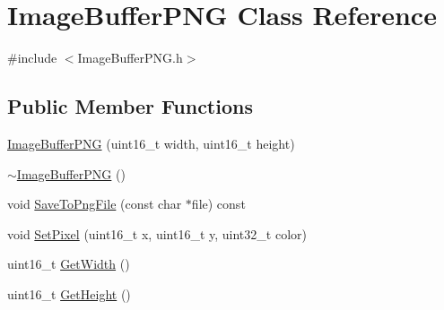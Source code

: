 \hypertarget{class_image_buffer_p_n_g}{\section{Image\-Buffer\-P\-N\-G Class Reference}
\label{class_image_buffer_p_n_g}
}


{\ttfamily \#include $<$Image\-Buffer\-P\-N\-G.\-h$>$}

\subsection*{Public Member Functions}
\begin{DoxyCompactItemize}
\item 
\hyperlink{class_image_buffer_p_n_g_a983171facccfa80ff2878648ce5014e6}{Image\-Buffer\-P\-N\-G} (uint16\-\_\-t width, uint16\-\_\-t height)
\item 
\hyperlink{class_image_buffer_p_n_g_adebf4533c8b386777325192611538a40}{$\sim$\-Image\-Buffer\-P\-N\-G} ()
\item 
void \hyperlink{class_image_buffer_p_n_g_a3476773334d84326b7d797bfe111f8ec}{Save\-To\-Png\-File} (const char $\ast$file) const 
\item 
void \hyperlink{class_image_buffer_p_n_g_afb558bdd2d0041dcb2edfdc09ffe0bb8}{Set\-Pixel} (uint16\-\_\-t x, uint16\-\_\-t y, uint32\-\_\-t color)
\item 
uint16\-\_\-t \hyperlink{class_image_buffer_p_n_g_a02707482b138029928e838cb0d63e0fd}{Get\-Width} ()
\item 
uint16\-\_\-t \hyperlink{class_image_buffer_p_n_g_a0f20f90058c6276f8494e06fb17368b1}{Get\-Height} ()
\end{DoxyCompactItemize}


